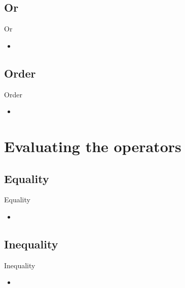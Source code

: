 \documentclass[18pt]{beamer}
\begin{document}
	\subsection{Or}
		\begin{frame}{Or}
		
			\begin{itemize}
				\item
			\end{itemize}
		
		\end{frame}
	
	\subsection{Order}
		\begin{frame}{Order}
		
			\begin{itemize}
				\item
			\end{itemize}
		
		\end{frame}
	
\section{Evaluating the operators}

	\subsection{Equality}
		\begin{frame}{Equality}
		
			\begin{itemize}
				\item
			\end{itemize}
		
		\end{frame}
	
	\subsection{Inequality}
		\begin{frame}{Inequality}
		
			\begin{itemize}
			\item
			\end{itemize}
		
		\end{frame}
	
\end{document}

